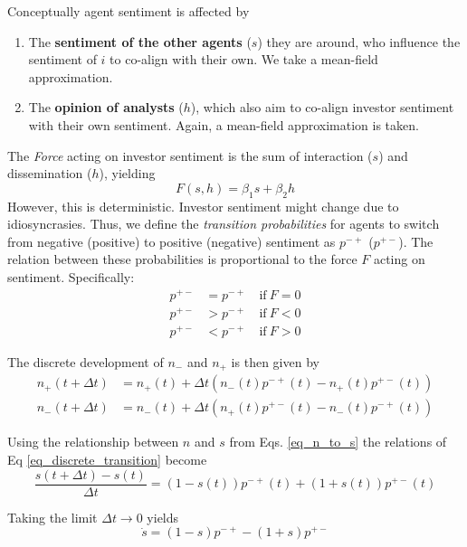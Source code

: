 \documentclass[11pt]{article}
\begin{document}
Conceptually agent sentiment is affected by
\begin{enumerate}
\item The \textbf{sentiment of the other agents} ($s$) they are around, who influence the sentiment of $i$ to co-align with their own. We take a mean-field approximation. 
\item The \textbf{opinion of analysts} ($h$), which also aim to co-align investor sentiment with their own sentiment. Again, a mean-field approximation is taken.
\end{enumerate}
The \textit{Force} acting on investor sentiment is the sum of interaction ($s$) and dissemination ($h$), yielding
\begin{equation}
F(s,h) = \beta_1s + \beta_2h
\end{equation}
However, this is deterministic. Investor sentiment might change due to idiosyncrasies. Thus, we define the \textit{transition probabilities} for agents to switch from negative (positive) to positive (negative) sentiment as $p^{-+}$ ($p^{+-}$). The relation between these probabilities is proportional to the force $F$ acting on sentiment. Specifically:
\begin{subequations}
\begin{align}
p^{+-} &= p^{-+} \quad \textrm{if}~F = 0\\
p^{+-} &> p^{-+} \quad \textrm{if}~F < 0\\
p^{+-} &< p^{-+} \quad \textrm{if}~F > 0
\end{align}
\end{subequations}

The discrete development of $n_-$ and $n_+$ is then given by
\begin{subequations}\label{eq_discrete_transition} 
\begin{align}
n_+(t + \Delta t) &= n_+(t) + \Delta t \left( n_-(t) p^{-+}(t) - n_+(t) p^{+-}(t) \right)\\
n_-(t + \Delta t) &= n_-(t) + \Delta t \left( n_+(t) p^{+-}(t) - n_-(t) p^{-+}(t) \right)
\end{align}
\end{subequations}

Using the relationship between $n$ and $s$ from Eqs. \ref{eq_n_to_s} the relations of Eq \eqref{eq_discrete_transition} become
\begin{equation}
\frac{s(t+\Delta t) - s(t)}{\Delta t} = (1-s(t))p^{-+}(t) + (1+s(t))p^{+-}(t)
\end{equation}

Taking the limit $\Delta t \rightarrow 0$ yields
\begin{equation}\label{eq_cont_transition}
\dot{s} = (1-s)p^{-+} - (1+s)p^{+-}
\end{equation}
\end{document}
